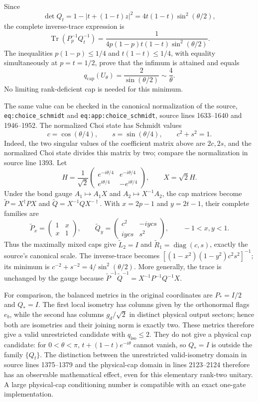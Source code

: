 \documentclass[11pt]{article}
\begin{document}
Since
\[
 \det Q_t=1-|t+(1-t)z|^2
          =4t(1-t)\sin^2(\theta/2),
\]
the complete inverse-trace expression is
\[
 \operatorname{Tr}(P_p^{-1}Q_t^{-1})
 =\frac{1}{4p(1-p)t(1-t)\sin^2(\theta/2)}.
\]
The inequalities $p(1-p)\le1/4$ and $t(1-t)\le1/4$, with equality
simultaneously at $p=t=1/2$, prove that the infimum is attained and equals
\[
 \boxed{\displaystyle q_{\mathrm{cap}}(U_\theta)
       =\frac{2}{\sin(\theta/2)}\sim\frac4\theta.}
\]
No limiting rank-deficient cap is needed for this minimum.

The same value can be checked in the canonical normalization of the
source, \nolinkurl{eq:choice_schmidt} and
\nolinkurl{eq:app:choice_schmidt}, source lines 1633--1640 and
1946--1952. The normalized Choi state has Schmidt values
\[
 c=\cos(\theta/4),\qquad s=\sin(\theta/4),\qquad c^2+s^2=1.
\]
Indeed, the two singular values of the coefficient matrix above are
$2c,2s$, and the normalized Choi state divides this matrix by two;
compare the normalization in source line 1393.
Let
\[
 H=\frac1{\sqrt2}\begin{pmatrix}
 e^{-i\theta/4}&e^{-i\theta/4}\\
 e^{i\theta/4}&-e^{i\theta/4}
 \end{pmatrix},\qquad X=\sqrt2H.
\]
Under the bond gauge $A_1\mapsto A_1X$ and
$A_2\mapsto X^{-1}A_2$, the cap matrices become
$\widetilde P=X^\dagger PX$ and
$\widetilde Q=X^{-1}QX^{-\dagger}$.
With $x=2p-1$ and $y=2t-1$, their complete families are
\[
 \widetilde P_x=\begin{pmatrix}1&x\\x&1\end{pmatrix},\qquad
 \widetilde Q_y=\begin{pmatrix}c^2&-i ycs\\i ycs&s^2\end{pmatrix},
 \qquad -1<x,y<1.
\]
Thus the maximally mixed caps give
$\widetilde L_2=I$ and $\widetilde R_1=\operatorname{diag}(c,s)$,
exactly the source's canonical scale. The inverse-trace becomes
$[(1-x^2)(1-y^2)c^2s^2]^{-1}$; its minimum is
$c^{-2}+s^{-2}=4/\sin^2(\theta/2)$.
More generally, the trace is unchanged by the gauge because
$\widetilde P^{-1}\widetilde Q^{-1}
 =X^{-1}P^{-1}Q^{-1}X$.

For comparison, the balanced metrics in the original coordinates are
$P_*=I/2$ and $Q_*=I$. The first local isometry has columns given by the
orthonormal flags $e_b$, while the second has columns $g_d/\sqrt2$ in
distinct physical output sectors; hence both are isometries and their
joining norm is exactly two. These metrics therefore give a valid
unrestricted candidate with $q_{\mathrm{iso}}\le2$.
They do not give a physical cap candidate: for $0<\theta<\pi$,
$t+(1-t)e^{-i\theta}$ cannot vanish, so $Q_*=I$ is outside the family
$\{Q_t\}$.
The distinction between the unrestricted valid-isometry domain in
source lines 1375--1379 and the physical-cap domain in lines
2123--2124 therefore has an observable mathematical effect, even for
this elementary rank-two unitary. A large physical-cap conditioning
number is compatible with an exact one-gate implementation.
\end{document}
